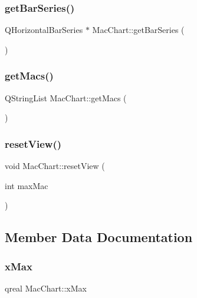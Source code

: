 \subsubsection{\texorpdfstring{get\+Bar\+Series()}{getBarSeries()}}
{\footnotesize\ttfamily Q\+Horizontal\+Bar\+Series $\ast$ Mac\+Chart\+::get\+Bar\+Series (\begin{DoxyParamCaption}{ }\end{DoxyParamCaption})}

\mbox{\label{class_mac_chart_aa43f71c446eb28ba714db92284fffea9}} 
\subsubsection{\texorpdfstring{get\+Macs()}{getMacs()}}
{\footnotesize\ttfamily Q\+String\+List Mac\+Chart\+::get\+Macs (\begin{DoxyParamCaption}{ }\end{DoxyParamCaption})}

\mbox{\label{class_mac_chart_a596828ccb8442002e14101c75803eb78}} 
\subsubsection{\texorpdfstring{reset\+View()}{resetView()}}
{\footnotesize\ttfamily void Mac\+Chart\+::reset\+View (\begin{DoxyParamCaption}\item[{int}]{max\+Mac }\end{DoxyParamCaption})}



\subsection{Member Data Documentation}
\mbox{\label{class_mac_chart_ad583b1039abca5c77319b584c920f422}} 
\subsubsection{\texorpdfstring{x\+Max}{xMax}}
{\footnotesize\ttfamily qreal Mac\+Chart\+::x\+Max}

